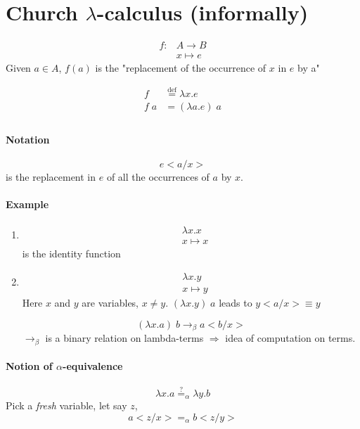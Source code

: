 \documentclass{article}
\begin{document}
\section{Church $\lambda$-calculus (informally)}
\begin{align*}
f: &A \to B\\
& x \mapsto e
\end{align*}
Given $a\in A$, $f(a)$ is the "replacement of the occurrence of $x$ in $e$ by a"

\begin{align*}
f & \overset{\text{def}}{=} \lambda x.e \tag{$\lambda$-abstraction}\\
f\;a & = (\lambda a.e) \;a \tag{Application}\\
\end{align*}

\paragraph{Notation}
\[e<a/x>\] is the replacement in $e$ of all the occurrences of $a$ by $x$.

\paragraph{Example}
\begin{enumerate}
\item \begin{align*}
&\lambda x. x\\
&x\mapsto x
\end{align*}
is the identity function
\item \begin{align*}
&\lambda x.y\\
&x\mapsto y
\end{align*}
Here $x$ and $y$ are variables, $x\neq y$. $(\lambda x.y)\; a$ leads to $y<a/x>\equiv y$

\[ (\lambda x.a) \; b \to_\beta a<b/x>\]
$\to_\beta$ is a binary relation on lambda-terms $\Rightarrow$ idea of computation on terms.

\end{enumerate}

\paragraph{Notion of $\alpha$-equivalence}
\[\lambda x.a \overset{?}{=}_\alpha \lambda y.b\]
Pick a \emph{fresh} variable, let say $z$,
\[a<z/x> =_\alpha b<z/y>\]
\end{document}
